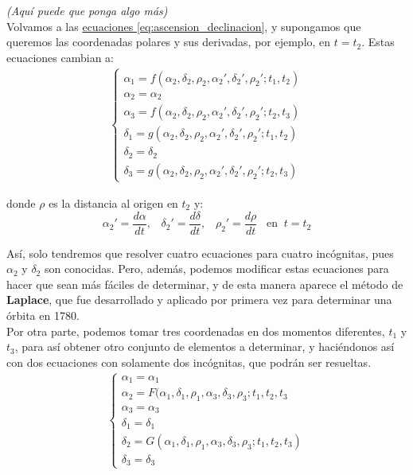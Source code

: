 \documentclass[11pt]{article}
\begin{document}
\textit{(Aquí puede que ponga algo más)}\\

Volvamos a las \hyperref[eq:ascension_declinacion]{ecuaciones \ref{eq:ascension_declinacion}}, y supongamos que queremos las coordenadas polares y sus derivadas, por ejemplo, en $t=t_2$. Estas ecuaciones cambian a:
\begin{align}
\left\{\begin{array}{l}
	\alpha_1 = f(\alpha_2, \delta_2, \rho_2, \alpha_2', \delta_2', \rho_2'; t_1, t_2)\\ 
	\alpha_2 = \alpha_2\\
	\alpha_3 = f(\alpha_2, \delta_2, \rho_2, \alpha_2', \delta_2', \rho_2'; t_2, t_3)\\
	\delta_1 = g(\alpha_2, \delta_2, \rho_2, \alpha_2', \delta_2', \rho_2'; t_1, t_2)\\
	\delta_2 = \delta_2\\
	\delta_3 = g(\alpha_2, \delta_2, \rho_2, \alpha_2', \delta_2', \rho_2'; t_2, t_3)
\end{array}
\right.
\label{eq:idea_laplace}
\end{align}

\noindent donde $\rho$ es la distancia al origen en $t_2$ y:
\[
\alpha_2'=\frac{d\alpha}{dt}, \; \; \; \delta_2'=\frac{d\delta}{dt}, \; \; \; \rho_2'=\frac{d\rho}{dt} \; \; \;  \text{en} \; \; t=t_2
\]

Así, solo tendremos que resolver cuatro ecuaciones para cuatro incógnitas, pues $\alpha_2$ y $\delta_2$ son conocidas. Pero, además, podemos modificar estas ecuaciones para hacer que sean más fáciles de determinar, y de esta manera aparece el método de \textbf{Laplace}, que fue desarrollado y aplicado por primera vez para determinar una órbita en 1780.\\

Por otra parte, podemos tomar tres coordenadas en dos momentos diferentes, $t_1$ y $t_3$, para así obtener otro conjunto de elementos a determinar, y haciéndonos así con dos ecuaciones con solamente dos incógnitas, que podrán ser resueltas.
\begin{align}
\left\{\begin{array}{l}
	\alpha_1 = \alpha_1\\
	\alpha_2 = F(\alpha_1, \delta_1, \rho_1, \alpha_3, \delta_3, \rho_3; t_1, t_2, t_3\\
	\alpha_3 = \alpha_3\\
	\delta_1 = \delta_1\\
	\delta_2 = G(\alpha_1, \delta_1, \rho_1, \alpha_3, \delta_3, \rho_3; t_1, t_2, t_3)\\
	\delta_3 = \delta_3
\end{array}
\right.
\label{eq:camino_gauss}
\end{align}
\end{document}
